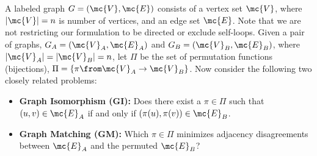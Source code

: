 \documentclass[11pt]{article}
\begin{document}
A labeled graph $G=(\mc{V},\mc{E})$ consists of a vertex set $\mc{V}$, where $|\mc{V}|=n$ is number of vertices, and an edge set $\mc{E}$. %
Note that we are not restricting our formulation to be directed or exclude self-loops. Given a pair of graphs, $G_A=(\mc{V}_A,\mc{E}_A)$ and $G_B=(\mc{V}_B,\mc{E}_B)$, where $|\mc{V}_A|=|\mc{V}_B|=n$, 
let $\Pi$ be the set of permutation functions (bijections), $\Pi=\{\pi \from \mc{V}_A \to \mc{V}_B\}$.
Now consider the following two closely related problems:
\begin{itemize}
	\item \textbf{Graph Isomorphism (GI):}  Does there exist a $\pi \in \Pi$ such that $(u,v) \in \mc{E}_A$ if and only if $(\pi(u),\pi(v)) \in \mc{E}_B$. 
		\item \textbf{Graph Matching (GM):}
		 Which $\pi \in \Pi$ minimizes adjacency disagreements between $\mc{E}_A$ and the permuted $\mc{E}_B$?
\end{itemize}
\end{document}
